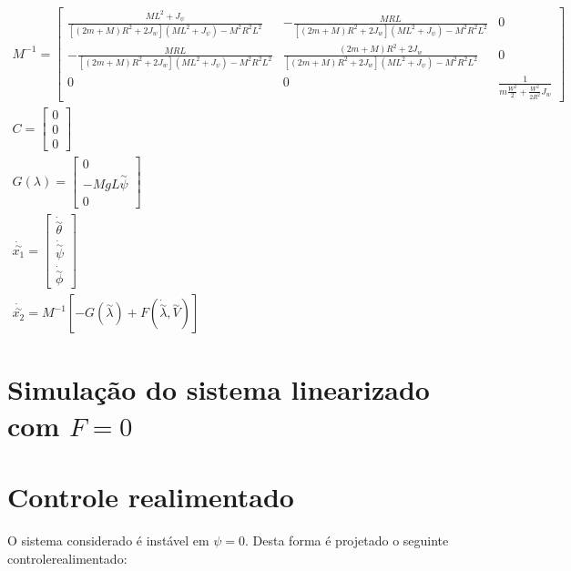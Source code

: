\documentclass[10pt]{article}
\begin{document}
\begin{equation}
\begin{gathered}
    M^{-1} =
    \begin{bmatrix}
        \frac{ML^2 + J_\psi}{[(2m + M)R^2 + 2J_w](ML^2 + J_\psi) - M^2R^2L^2} & -\frac{MRL}{[(2m + M)R^2 + 2J_w](ML^2 + J_\psi) - M^2R^2L^2} & 0 \\
        -\frac{MRL}{[(2m + M)R^2 + 2J_w](ML^2 + J_\psi) - M^2R^2L^2} & \frac{(2m + M)R^2 + 2J_w}{[(2m + M)R^2 + 2J_w](ML^2 + J_\psi) - M^2R^2L^2} & 0 \\
        0 & 0 & \frac{1}{m\frac{W^2}{2} + \frac{W^2}{2R^2}J_w}
    \end{bmatrix} \\
    C =
    \begin{bmatrix}
        0 \\ 0 \\ 0
    \end{bmatrix} \\
    G(\lambda) =
    \begin{bmatrix}
        0 \\ -MgL\overset{\sim}{\psi} \\ 0
    \end{bmatrix} \\
    \dot{\overset{\sim}{x_1}} = \begin{bmatrix}
        \dot{\overset{\sim}{\theta}} \\
        \dot{\overset{\sim}{\psi}} \\
        \dot{\overset{\sim}{\phi}}
    \end{bmatrix} \\
    \dot{\overset{\sim}{x_2}} = M^{-1} \left[ - G( \overset{\sim}{\lambda} ) + F( \dot{\overset{\sim}{\lambda}} , \overset{\sim}{V} ) \right]
\end{gathered}
\end{equation}

\section{Simulação do sistema linearizado com $F=0$}

\section{Controle realimentado}

O sistema considerado é instável em $\psi = 0$.
Desta forma é projetado o seguinte controlerealimentado:
\end{document}

